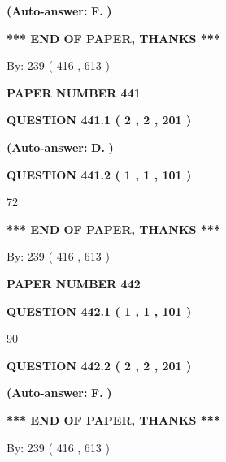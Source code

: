 \documentclass[12pt]{article}
\begin{document}
 
{\textbf{(Auto-answer:}}
{\textbf{\large{
F.}}}
{\textbf{)}}
 
 
   
   
   
   
\vspace{1.0in} 
{\textbf{\large{ *** END OF PAPER, THANKS *** }}} 
   
   
\hspace{1.0in} By: 
 239 ( 416 ,  613 )
   
   
   
   
\newpage 
\setcounter{page}{ 
   441001 } 
   
   
 {\textbf{ \Large{ PAPER NUMBER  441  }}}
   
   
   
   
  
  
{\textbf{\large{QUESTION
441.1 
 ( 2 , 2 , 201 )
}}}
 
 
{\textbf{(Auto-answer:}}
{\textbf{\large{
D.}}}
{\textbf{)}}
 
 
  
  
{\textbf{\large{QUESTION
441.2 
 ( 1 , 1 , 101 )
}}}

72
   
   
   
   
\vspace{1.0in} 
{\textbf{\large{ *** END OF PAPER, THANKS *** }}} 
   
   
\hspace{1.0in} By: 
 239 ( 416 ,  613 )
   
   
   
   
\newpage 
\setcounter{page}{ 
   442001 } 
   
   
 {\textbf{ \Large{ PAPER NUMBER  442  }}}
   
   
   
   
  
  
{\textbf{\large{QUESTION
442.1 
 ( 1 , 1 , 101 )
}}}

90
  
  
{\textbf{\large{QUESTION
442.2 
 ( 2 , 2 , 201 )
}}}
 
 
{\textbf{(Auto-answer:}}
{\textbf{\large{
F.}}}
{\textbf{)}}
 
 
   
   
   
   
\vspace{1.0in} 
{\textbf{\large{ *** END OF PAPER, THANKS *** }}} 
   
   
\hspace{1.0in} By: 
 239 ( 416 ,  613 )
   
   
   
\end{document}

